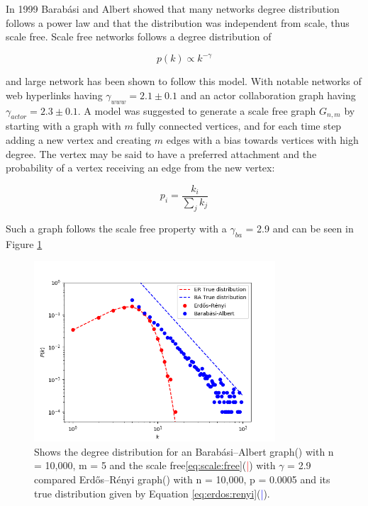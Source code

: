 In 1999 Barabási and Albert showed that many networks degree distribution follows a power law and that the distribution was independent from scale, thus scale free\cite{barabasi:albert:emergent:scaling}. Scale free networks follows a degree distribution of

\begin{equation}
	 p(k) \propto k^{-\gamma} 
	\label{eq:scale:free}
\end{equation}

and large network has been shown to follow this model. With notable networks of web hyperlinks having $\gamma_{www} = 2.1\pm 0.1$ and an actor collaboration graph having $\gamma_{actor} = 2.3\pm0.1$.
A model was suggested to generate a scale free graph $G_{n, m}$ by starting with a graph with $m$ fully connected vertices, and for each time step adding a new vertex and creating $m$ edges with a bias towards vertices with high degree. The vertex may be said to have a preferred attachment and the probability of a vertex receiving an edge from the new vertex:

\[ p_i = \dfrac{k_i}{\sum_{j}^{}k_j}  \]

Such a graph follows the scale free property with a $\gamma_{ba}$ = 2.9 and can be seen in Figure \ref{fig:scale_free}

\begin{figure}[!htb]
	\hspace*{-0.5cm} 
	\centering
	\includegraphics[width=9cm]{images/scale_free_degree_distribution.png}
	\caption{Shows the degree distribution for an Barabási–Albert graph(\tikzcircle[red, fill=red]{2pt}) with n = 10,000, m = 5 and the scale free\ref{eq:scale:free}(\textcolor{red}{|}) with $\gamma$ = 2.9 compared Erdős–Rényi graph(\tikzcircle[blue, fill=blue]{2pt}) with n = 10,000, p = 0.0005 and its true distribution given by Equation \ref{eq:erdos:renyi}(\textcolor{blue}{|}).
	}
	\label{fig:scale_free}
	\hspace*{2mm} 
\end{figure}

